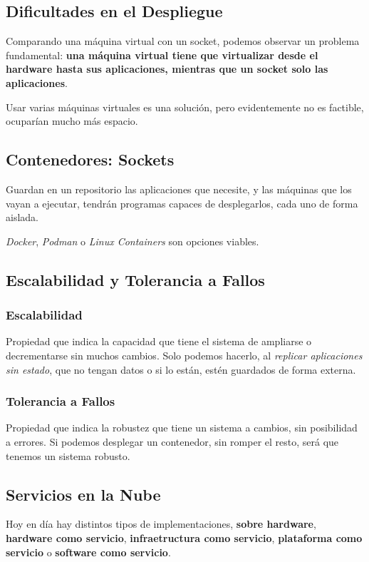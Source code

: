 \subsection{Dificultades en el Despliegue}
\noindent Comparando una máquina virtual con un socket, podemos observar un problema fundamental: \textbf{una máquina virtual tiene que virtualizar desde el hardware hasta sus aplicaciones, mientras que un socket solo las aplicaciones}.
\par\noindent Usar varias máquinas virtuales es una solución, pero evidentemente no es factible, ocuparían mucho más espacio.
\subsection{Contenedores: Sockets}
\noindent Guardan en un repositorio las aplicaciones que necesite, y las máquinas que los vayan a ejecutar, tendrán programas capaces de desplegarlos, cada uno de forma aislada.
\par\noindent \textit{Docker}, \textit{Podman} o \textit{Linux Containers} son opciones viables.
\subsection{Escalabilidad y Tolerancia a Fallos}
\subsubsection{Escalabilidad}
\noindent Propiedad que indica la capacidad que tiene el sistema de ampliarse o decrementarse sin muchos cambios. Solo podemos hacerlo, al \textit{replicar aplicaciones sin estado}, que no tengan datos o si lo están, estén guardados de forma externa.
\subsubsection{Tolerancia a Fallos}
\noindent Propiedad que indica la robustez que tiene un sistema a cambios, sin posibilidad a errores. Si podemos desplegar un contenedor, sin romper el resto, será que tenemos un sistema robusto.
\subsection{Servicios en la Nube}
\noindent Hoy en día hay distintos tipos de implementaciones, \textbf{sobre hardware}, \textbf{hardware como servicio}, \textbf{infraetructura como servicio}, \textbf{plataforma como servicio} o \textbf{software como servicio}.